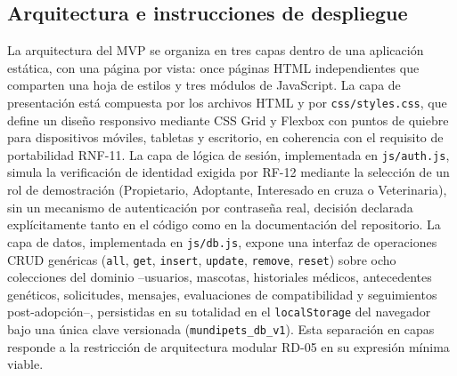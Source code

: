\documentclass[journal,onecolumn]{IEEEtran}
\begin{document}
	\subsection{Arquitectura e instrucciones de despliegue}
	\label{sec:mvp-arquitectura}
	
	La arquitectura del MVP se organiza en tres capas dentro de una aplicación
	estática, con una página por vista: once páginas HTML independientes que
	comparten una hoja de estilos y tres módulos de JavaScript. La capa de
	presentación está compuesta por los archivos HTML y por
	\texttt{css/styles.css}, que define un diseño responsivo mediante CSS Grid
	y Flexbox con puntos de quiebre para dispositivos móviles, tabletas y
	escritorio, en coherencia con el requisito de portabilidad RNF-11. La capa
	de lógica de sesión, implementada en \texttt{js/auth.js}, simula la
	verificación de identidad exigida por RF-12 mediante la selección de un rol
	de demostración (Propietario, Adoptante, Interesado en cruza o
	Veterinaria), sin un mecanismo de autenticación por contraseña real,
	decisión declarada explícitamente tanto en el código como en la
	documentación del repositorio. La capa de datos, implementada en
	\texttt{js/db.js}, expone una interfaz de operaciones CRUD genéricas
	(\texttt{all}, \texttt{get}, \texttt{insert}, \texttt{update},
	\texttt{remove}, \texttt{reset}) sobre ocho colecciones del dominio
	--usuarios, mascotas, historiales médicos, antecedentes genéticos,
	solicitudes, mensajes, evaluaciones de compatibilidad y seguimientos
	post-adopción--, persistidas en su totalidad en el \texttt{localStorage}
	del navegador bajo una única clave versionada
	(\texttt{mundipets\_db\_v1}). Esta separación en capas responde a la
	restricción de arquitectura modular RD-05 en su expresión mínima viable.
	
\end{document}
